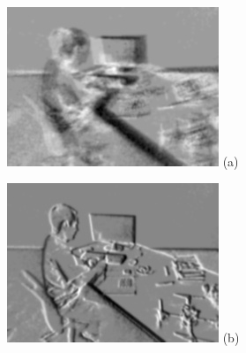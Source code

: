 \begin{figure}
  \begin{minipage}[t]{0.48\textwidth}
    \centering \includegraphics[width =
    \textwidth]{images/zero_motion_934.jpg} (a)
  \end{minipage}
  \hfill
  \begin{minipage}[t]{0.48\textwidth}
    \centering \includegraphics[width =
    \textwidth]{images/optimized_934.jpg} (b)
  \end{minipage}
  \hfill
  \begin{minipage}[t]{0.48\textwidth}

\end{minipage}
\end{figure}

